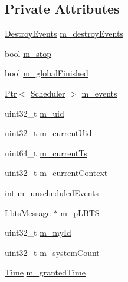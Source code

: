 \subsection*{Private Attributes}
\begin{DoxyCompactItemize}
\item 
\hyperlink{classns3_1_1DistributedSimulatorImpl_aa24afccd74580b3d5903cc258a51944a}{Destroy\+Events} \hyperlink{classns3_1_1DistributedSimulatorImpl_a06452ba2e8208fef78ed3ee8a788eb13}{m\+\_\+destroy\+Events}
\item 
bool \hyperlink{classns3_1_1DistributedSimulatorImpl_aeda2f900518205bb35085c6b735f55ad}{m\+\_\+stop}
\item 
bool \hyperlink{classns3_1_1DistributedSimulatorImpl_a90cc2380329f315b75bd414062b04cd8}{m\+\_\+global\+Finished}
\item 
\hyperlink{classns3_1_1Ptr}{Ptr}$<$ \hyperlink{classns3_1_1Scheduler}{Scheduler} $>$ \hyperlink{classns3_1_1DistributedSimulatorImpl_a62caa947f3f3c6c79b6d58b6949d2c10}{m\+\_\+events}
\item 
uint32\+\_\+t \hyperlink{classns3_1_1DistributedSimulatorImpl_a918c24f35d9579a75f064b3a3f81d165}{m\+\_\+uid}
\item 
uint32\+\_\+t \hyperlink{classns3_1_1DistributedSimulatorImpl_af2eeda6115d343a4123bf6d7decdb071}{m\+\_\+current\+Uid}
\item 
uint64\+\_\+t \hyperlink{classns3_1_1DistributedSimulatorImpl_a469b43a00af2733d46eff6c1da55f36c}{m\+\_\+current\+Ts}
\item 
uint32\+\_\+t \hyperlink{classns3_1_1DistributedSimulatorImpl_a30651c5fb4ca5cc15a13417510ca89f4}{m\+\_\+current\+Context}
\item 
int \hyperlink{classns3_1_1DistributedSimulatorImpl_ab02d06ce1c42a073c45b5ab0ed8d45d6}{m\+\_\+unscheduled\+Events}
\item 
\hyperlink{classns3_1_1LbtsMessage}{Lbts\+Message} $\ast$ \hyperlink{classns3_1_1DistributedSimulatorImpl_a356ad357bd5163fc7c367cdac6b22911}{m\+\_\+p\+L\+B\+TS}
\item 
uint32\+\_\+t \hyperlink{classns3_1_1DistributedSimulatorImpl_a76a61030e685c239cc97d6b61b07fd18}{m\+\_\+my\+Id}
\item 
uint32\+\_\+t \hyperlink{classns3_1_1DistributedSimulatorImpl_acc5d9ac05b8d3d9876b327aaabe5607e}{m\+\_\+system\+Count}
\item 
\hyperlink{classns3_1_1Time}{Time} \hyperlink{classns3_1_1DistributedSimulatorImpl_a2b793ea16a0f2e786742813d2bcdc2f4}{m\+\_\+granted\+Time}
\end{DoxyCompactItemize}
